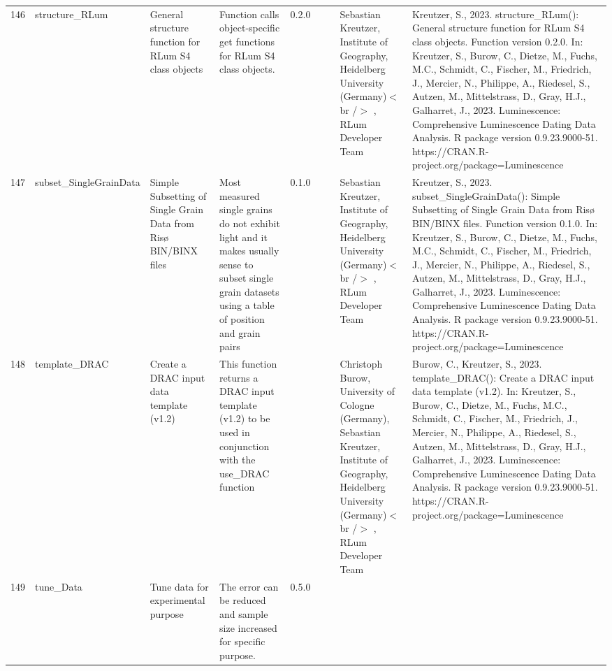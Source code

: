 \begin{table}[ht]
\begin{tabular}{rllllllll}
 \\ 
  146 & structure\_RLum & General structure function for RLum S4 class objects & Function calls object-specific get functions for RLum S4 class objects. & 0.2.0
 &  &  & Sebastian Kreutzer, Institute of Geography, Heidelberg University (Germany)$<$br /$>$ , RLum Developer Team & Kreutzer, S., 2023. structure\_RLum(): General structure function for RLum S4 class objects. Function version 0.2.0. In: Kreutzer, S., Burow, C., Dietze, M., Fuchs, M.C., Schmidt, C., Fischer, M., Friedrich, J., Mercier, N., Philippe, A., Riedesel, S., Autzen, M., Mittelstrass, D., Gray, H.J., Galharret, J., 2023. Luminescence: Comprehensive Luminescence Dating Data Analysis. R package version 0.9.23.9000-51. https://CRAN.R-project.org/package=Luminescence
 \\ 
  147 & subset\_SingleGrainData & Simple Subsetting of Single Grain Data from Risø BIN/BINX files & Most measured single grains do not exhibit light and it makes usually sense to subset single grain datasets using a table of position and grain pairs & 0.1.0
 &  &  & Sebastian Kreutzer, Institute of Geography, Heidelberg University (Germany)$<$br /$>$ , RLum Developer Team & Kreutzer, S., 2023. subset\_SingleGrainData(): Simple Subsetting of Single Grain Data from Risø BIN/BINX files. Function version 0.1.0. In: Kreutzer, S., Burow, C., Dietze, M., Fuchs, M.C., Schmidt, C., Fischer, M., Friedrich, J., Mercier, N., Philippe, A., Riedesel, S., Autzen, M., Mittelstrass, D., Gray, H.J., Galharret, J., 2023. Luminescence: Comprehensive Luminescence Dating Data Analysis. R package version 0.9.23.9000-51. https://CRAN.R-project.org/package=Luminescence
 \\ 
  148 & template\_DRAC & Create a DRAC input data template (v1.2) & This function returns a DRAC input template (v1.2) to be used in conjunction with the  use\_DRAC  function &  &  &  & Christoph Burow, University of Cologne (Germany), Sebastian Kreutzer, Institute of Geography, Heidelberg University (Germany)$<$br /$>$ , RLum Developer Team & Burow, C., Kreutzer, S., 2023. template\_DRAC(): Create a DRAC input data template (v1.2). In: Kreutzer, S., Burow, C., Dietze, M., Fuchs, M.C., Schmidt, C., Fischer, M., Friedrich, J., Mercier, N., Philippe, A., Riedesel, S., Autzen, M., Mittelstrass, D., Gray, H.J., Galharret, J., 2023. Luminescence: Comprehensive Luminescence Dating Data Analysis. R package version 0.9.23.9000-51. https://CRAN.R-project.org/package=Luminescence
 \\ 
  149 & tune\_Data & Tune data for experimental purpose & The error can be reduced and sample size increased for specific purpose. & 0.5.0

\end{tabular}
\end{table}
